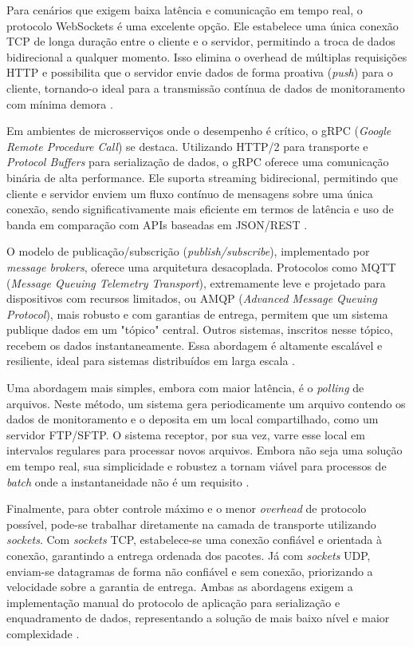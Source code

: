 Para cenários que exigem baixa latência e comunicação em tempo real, o protocolo WebSockets é uma excelente opção. Ele estabelece uma única conexão TCP de longa duração entre o cliente e o servidor, permitindo a troca de dados bidirecional a qualquer momento. Isso elimina o overhead de múltiplas requisições HTTP e possibilita que o servidor envie dados de forma proativa (\textit{push}) para o cliente, tornando-o ideal para a transmissão contínua de dados de monitoramento com mínima demora \cite{websocket_rfc}.

Em ambientes de microsserviços onde o desempenho é crítico, o gRPC (\textit{Google Remote Procedure Call}) se destaca. Utilizando HTTP/2 para transporte e \textit{Protocol Buffers} para serialização de dados, o gRPC oferece uma comunicação binária de alta performance. Ele suporta streaming bidirecional, permitindo que cliente e servidor enviem um fluxo contínuo de mensagens sobre uma única conexão, sendo significativamente mais eficiente em termos de latência e uso de banda em comparação com APIs baseadas em JSON/REST \cite{grpc_docs}.

O modelo de publicação/subscrição (\textit{publish/subscribe}), implementado por \textit{message brokers}, oferece uma arquitetura desacoplada. Protocolos como MQTT (\textit{Message Queuing Telemetry Transport}), extremamente leve e projetado para dispositivos com recursos limitados, ou AMQP (\textit{Advanced Message Queuing Protocol}), mais robusto e com garantias de entrega, permitem que um sistema publique dados em um "tópico" central. Outros sistemas, inscritos nesse tópico, recebem os dados instantaneamente. Essa abordagem é altamente escalável e resiliente, ideal para sistemas distribuídos em larga escala \cite{amqp_spec} \cite{mqtt_spec}.

Uma abordagem mais simples, embora com maior latência, é o \textit{polling} de arquivos. Neste método, um sistema gera periodicamente um arquivo contendo os dados de monitoramento e o deposita em um local compartilhado, como um servidor FTP/SFTP. O sistema receptor, por sua vez, varre esse local em intervalos regulares para processar novos arquivos. Embora não seja uma solução em tempo real, sua simplicidade e robustez a tornam viável para processos de \textit{batch} onde a instantaneidade não é um requisito \cite{ftp_rfc}.

Finalmente, para obter controle máximo e o menor \textit{overhead} de protocolo possível, pode-se trabalhar diretamente na camada de transporte utilizando \textit{sockets}. Com \textit{sockets} TCP, estabelece-se uma conexão confiável e orientada à conexão, garantindo a entrega ordenada dos pacotes. Já com \textit{sockets} UDP, enviam-se datagramas de forma não confiável e sem conexão, priorizando a velocidade sobre a garantia de entrega. Ambas as abordagens exigem a implementação manual do protocolo de aplicação para serialização e enquadramento de dados, representando a solução de mais baixo nível e maior complexidade \cite{tcp_rfc} \cite{udp_rfc}.
 
